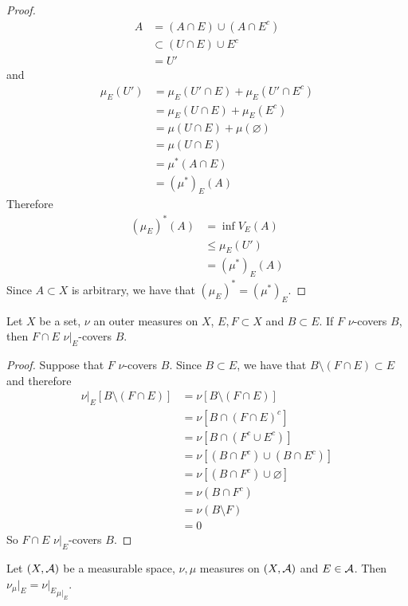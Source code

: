 \documentclass{book}
\begin{document}
\begin{proof}
\begin{align*}
			A 
			& = (A \cap E) \cup (A \cap E^c) \\
			& \subset (U \cap E) \cup E^c \\
			& = U'
		\end{align*}
		and 
		\begin{align*}
			\mu_E(U')
			& = \mu_E(U' \cap E) + \mu_E(U' \cap E^c) \\
			& = \mu_E(U \cap E) + \mu_E(E^c) \\
			& = \mu(U \cap E) + \mu(\varnothing) \\
			& = \mu(U \cap E) \\
			& = \mu^*(A \cap E) \\
			& = (\mu^*)_E(A)
		\end{align*}
		Therefore 
		\begin{align*}
			(\mu_E)^*(A)
			& = \inf V_E(A) \\
			& \leq \mu_E(U') \\
			& = (\mu^*)_E(A)
		\end{align*}
		Since $A \subset X$ is arbitrary, we have that $(\mu_E)^* = (\mu^*)_E$. 
	\end{proof}
	

	\begin{ex}  
		Let $X$ be a set, $\nu$ an outer measures on $X$, $E, F \subset X$ and $B \subset E$. If $F$ $\nu$-covers $B$, then $F \cap E$ $\nu|_E$-covers $B$.
	\end{ex}

	\begin{proof}
		Suppose that $F$ $\nu$-covers $B$. Since $B \subset E$, we have that $B \setminus (F \cap E) \subset E$ and therefore
		\begin{align*}
			\nu|_E[B \setminus (F \cap E)]
			& = \nu[B \setminus (F \cap E)] \\
			& = \nu[B \cap (F \cap E)^c] \\
			& = \nu[B \cap (F^c \cup E^c)] \\
			& = \nu[(B \cap F^c) \cup (B \cap E^c)] \\
			& = \nu[(B \cap F^c) \cup \varnothing] \\
			& = \nu(B \cap F^c) \\
			& = \nu(B \setminus F) \\
			& = 0
		\end{align*} 
		So $F \cap E$ $\nu|_E$-covers $B$.
	\end{proof}
	
	\begin{ex}  
		Let $(X, \mathcal{A})$ be a measurable space, $\nu, \mu$ measures on $(X, \mathcal{A})$ and $E \in \mathcal{A}$. Then $\nu_{\mu}|_E = {\nu|_E}_{\mu|_E}$.  
	\end{ex}
	
\end{document}
